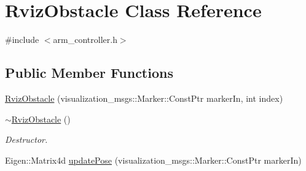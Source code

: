 \hypertarget{class_rviz_obstacle}{}\section{Rviz\+Obstacle Class Reference}
\label{class_rviz_obstacle}


{\ttfamily \#include $<$arm\+\_\+controller.\+h$>$}

\subsection*{Public Member Functions}
\begin{DoxyCompactItemize}
\item 
\hyperlink{class_rviz_obstacle_a3fb19f60434581b669c0dc063c026943}{Rviz\+Obstacle} (visualization\+\_\+msgs\+::\+Marker\+::\+Const\+Ptr marker\+In, int index)
\item 
\hyperlink{class_rviz_obstacle_aefa092d8dcad532408308c34cb4cddbe}{$\sim$\+Rviz\+Obstacle} ()\hypertarget{class_rviz_obstacle_aefa092d8dcad532408308c34cb4cddbe}{}\label{class_rviz_obstacle_aefa092d8dcad532408308c34cb4cddbe}

\begin{DoxyCompactList}\small\item\em Destructor. \end{DoxyCompactList}\item 
Eigen\+::\+Matrix4d \hyperlink{class_rviz_obstacle_a30101e2a3c65776bb4abbb139f10b14a}{update\+Pose} (visualization\+\_\+msgs\+::\+Marker\+::\+Const\+Ptr marker\+In)
\end{DoxyCompactItemize}
